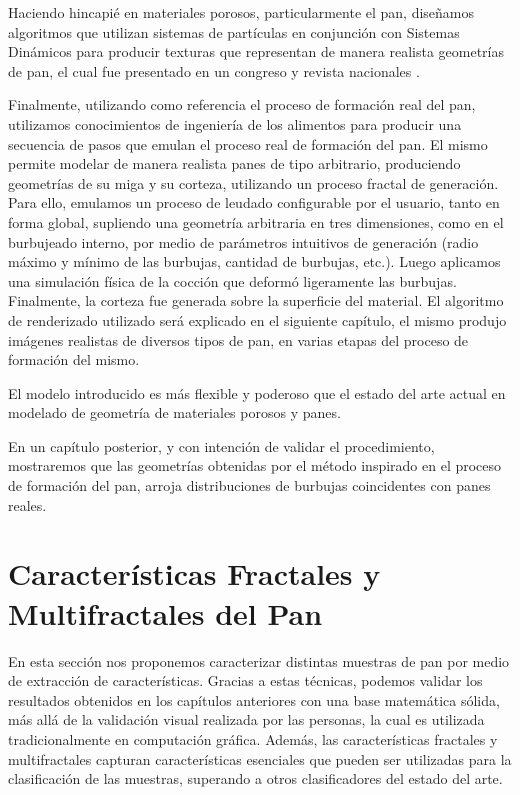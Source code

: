 \documentclass[spanish,a4paper,openright,11pt]{book}
\begin{document}
Haciendo hincapié en materiales porosos, particularmente el pan, diseñamos algoritmos que utilizan sistemas de partículas en conjunción con Sistemas Dinámicos para producir texturas que representan de manera realista geometrías de pan, el cual fue presentado en un congreso y revista nacionales \cite{Baravalle2014}.

Finalmente, utilizando como referencia el proceso de formación real del pan, utilizamos conocimientos de ingeniería de los alimentos para producir una secuencia de pasos que emulan el proceso real de formación del pan.
El mismo permite modelar de manera realista panes de tipo arbitrario, produciendo geometrías de su miga y su corteza, utilizando un proceso fractal de generación.
Para ello, emulamos un proceso de leudado configurable por el usuario, tanto en forma global, supliendo una geometría arbitraria en tres dimensiones, como en el burbujeado interno, por medio de parámetros intuitivos de generación (radio máximo y mínimo de las burbujas, cantidad de burbujas, etc.).
Luego aplicamos una simulación física de la cocción que deformó ligeramente las burbujas.
Finalmente, la corteza fue generada sobre la superficie del material.
El algoritmo de renderizado utilizado será explicado en el siguiente capítulo, el mismo produjo imágenes realistas de diversos tipos de pan, en varias etapas del proceso de formación del mismo.

El modelo introducido es más flexible y poderoso que el estado del arte actual en modelado de geometría de materiales porosos y panes.

En un capítulo posterior, y con intención de validar el procedimiento, mostraremos que las geometrías obtenidas por el método inspirado en el proceso de formación del pan, arroja distribuciones de burbujas coincidentes con panes reales.

\chapter{Características Fractales y Multifractales del Pan}
En esta sección nos proponemos caracterizar distintas muestras de pan por medio de extracción de características.
Gracias a estas t\'ecnicas, podemos validar los resultados obtenidos en los cap\'itulos anteriores con una base matem\'atica s\'olida, m\'as all\'a de la validaci\'on visual realizada por las personas, la cual es utilizada tradicionalmente en computaci\'on gr\'afica.
Además, las características fractales y multifractales capturan características esenciales que pueden ser utilizadas para la clasificación de las muestras, superando a otros clasificadores del estado del arte.
\end{document}
